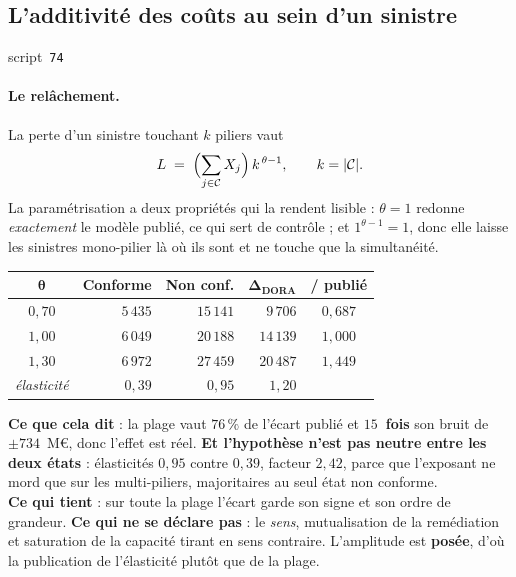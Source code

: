 \documentclass[11pt,a4paper]{article}
\newcommand{\src}[1]{\hfill{\footnotesize\textsf{script~\texttt{#1}}}}
\begin{document}
\subsection*{L'additivité des coûts au sein d'un sinistre}
\src{\texttt{74}}

\paragraph{Le relâchement.} La perte d'un sinistre touchant $k$ piliers vaut
\begin{equation}
L \;=\; \Bigl(\sum_{j \in \mathcal{C}} X_j\Bigr) \, k^{\,\theta - 1},
\qquad k = |\mathcal{C}|.
\end{equation}
La paramétrisation a deux propriétés qui la rendent lisible : $\theta = 1$ redonne
\emph{exactement} le modèle publié, ce qui sert de contrôle ; et $1^{\theta-1} = 1$, donc elle
laisse les sinistres mono-pilier là où ils sont et ne touche que la simultanéité.

\begin{center}\footnotesize
\renewcommand{\arraystretch}{1.15}
\begin{tabular}{@{}c r r r c@{}}
\toprule
$\boldsymbol{\theta}$ & \textbf{Conforme} & \textbf{Non conf.} &
$\boldsymbol{\Delta_{\text{DORA}}}$ & \textbf{/ publié} \\
\midrule
$0{,}70$ & $5\,435$ & $15\,141$ & $9\,706$ & $0{,}687$ \\
$1{,}00$ & $6\,049$ & $20\,188$ & $14\,139$ & $1{,}000$ \\
$1{,}30$ & $6\,972$ & $27\,459$ & $20\,487$ & $1{,}449$ \\
\midrule
\emph{élasticité} & $0{,}39$ & $0{,}95$ & $1{,}20$ & \\
\bottomrule
\end{tabular}
\end{center}

\begin{res}
\textbf{Ce que cela dit} : la plage vaut $76\,\%$ de l'écart publié et \textbf{$15$~fois} son
bruit de $\pm 734$~M\euro, donc l'effet est réel. \textbf{Et l'hypothèse n'est pas neutre entre
les deux états} : élasticités $0{,}95$ contre $0{,}39$, facteur $2{,}42$, parce que l'exposant ne
mord que sur les multi-piliers, majoritaires au seul état non conforme.\\
\textbf{Ce qui tient} : sur toute la plage l'écart garde son signe et son ordre de grandeur.
\textbf{Ce qui ne se déclare pas} : le \emph{sens}, mutualisation de la remédiation et saturation
de la capacité tirant en sens contraire. L'amplitude est \textbf{posée}, d'où la publication de
l'élasticité plutôt que de la plage.
\end{res}
\end{document}
